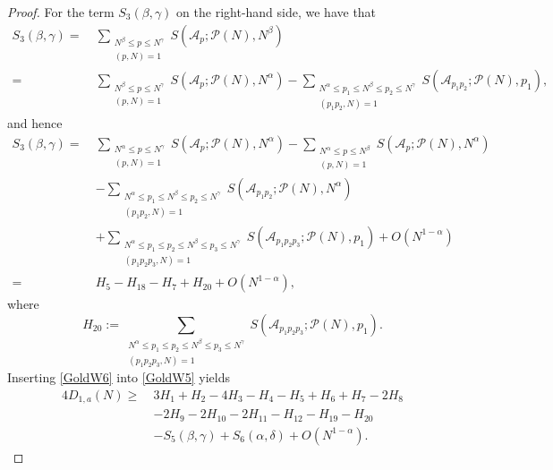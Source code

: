 \documentclass[10pt,a4paper]{amsart}
\def\ge{\geqslant}
\def\le{\leqslant}
\def\leq{\leqslant}
\begin{document}
\begin{proof}
For the term $S_3(\beta,\gamma)$ on the right-hand side, 
we have that 
\begin{equation*}
\begin{split}
S_3(\beta,\gamma)=\ &\sum_{\substack{N^\beta \le p \le N^\gamma \\ (p, N) = 1}} S(\mathscr{A}_p; \mathscr{P}(N), N^\beta)\\
=\ & \sum_{\substack{N^\beta \le p \le N^\gamma \\ (p, N) = 1}} S(\mathscr{A}_p; \mathscr{P}(N), N^\alpha)-\sum_{\substack{N^{\alpha} \leq p_1 \le N^{\beta} \le p_2 \le N^{\gamma} \\ (p_1 p_2, N) = 1}} S(\mathscr{A}_{p_1 p_2}; \mathscr{P}(N), p_1), 
\end{split}
\end{equation*}
and hence 
\begin{equation}\label{GoldW6}
\begin{split}
S_3(\beta,\gamma)
=\ & \sum_{\substack{N^\alpha \le p \le N^\gamma \\ (p, N) = 1}} S(\mathscr{A}_p; \mathscr{P}(N), N^\alpha)-\sum_{\substack{N^\alpha \le p \le N^\beta \\ (p, N) = 1}} S(\mathscr{A}_p; \mathscr{P}(N), N^\alpha)\\
		&-\sum_{\substack{N^{\alpha} \leq p_1 \le N^{\beta} \le p_2 \le N^{\gamma} \\ (p_1 p_2, N) = 1}} S(\mathscr{A}_{p_1 p_2}; \mathscr{P}(N), N^{\alpha})\\
		&+\sum_{\substack{N^{\alpha} \leq p_1 \le p_2 \le N^{\beta} \leq p_3 \le N^{\gamma}\\ (p_1 p_2 p_3, N) = 1}} S(\mathscr{A}_{p_1 p_2 p_3}; \mathscr{P}(N), p_1)+O(N^{1-\alpha})\\
		=\ &H_5-H_{18}-H_{7}+H_{20}+O(N^{1-\alpha}),
\end{split}
\end{equation}
where
\begin{equation}
H_{20}:=\sum_{\substack{N^{\alpha} \leq p_1 \le p_2 \le N^{\beta} \leq p_3 \le N^{\gamma}\\ (p_1 p_2 p_3, N) = 1}} 
S(\mathscr{A}_{p_1 p_2 p_3}; \mathscr{P}(N), p_1). 
\end{equation}
Inserting \eqref{GoldW6} into \eqref{GoldW5} yields 
\begin{equation}\label{GoldW7}
\begin{split}
4D_{1,a}(N)
\ge\ & 3H_1+H_2-4H_3-H_4-H_5+H_6+H_7 -2H_8\\ 
& -2H_9-2H_{10}-2H_{11} -H_{12}-H_{19}-H_{20} \\ 
& -S_5(\beta,\gamma)+S_6(\alpha,\delta)+O(N^{1-\alpha}).
\end{split}
\end{equation}


\end{proof}
\end{document}
